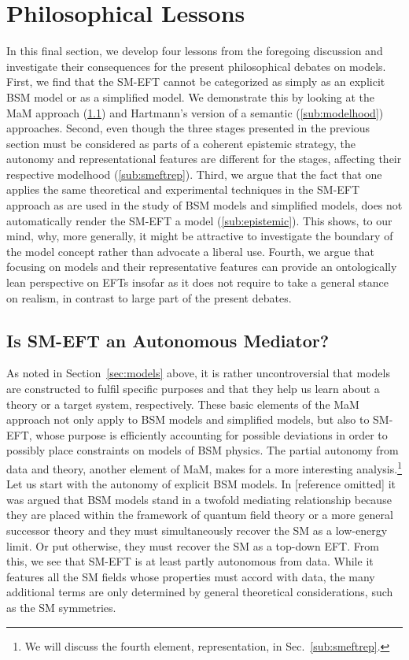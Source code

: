 \section{Philosophical Lessons}	%
\label{sec:analysis}


In this final section, we develop four lessons from the foregoing discussion and investigate their consequences for the present philosophical debates on models. 
First, we find that the SM-EFT cannot be categorized as simply as an explicit BSM model or as a simplified model. 
We demonstrate this by looking at the MaM approach (\ref{sub:autonomy}) and Hartmann's version of a semantic (\ref{sub:modelhood}) approaches. 
Second, even though the three stages presented in the previous section must be considered as parts of a coherent epistemic strategy, the autonomy and representational features are different for the stages, affecting their respective modelhood (\ref{sub:smeftrep}).
Third, we argue that the fact that one applies the same theoretical and experimental techniques in the SM-EFT approach as are used in the study of BSM models and simplified models, does not automatically render the SM-EFT a model (\ref{sub:epistemic}). 
This shows, to our mind, why, more generally, it might be attractive to investigate the boundary of the model concept rather than advocate a liberal use. 
Fourth, we argue that focusing on models and their representative features can provide an ontologically lean perspective on EFTs insofar as it does not require to take a general stance on realism, in contrast to large part of the present debates.


\subsection{Is SM-EFT an Autonomous Mediator?} %
\label{sub:autonomy}

As noted in Section~\ref{sec:models} above, it is rather uncontroversial that models are constructed to fulfil specific purposes and that they help us learn about a theory or a target system, respectively.
These basic elements of the MaM approach not only apply to BSM models and simplified models, but also to SM-EFT, whose purpose is efficiently accounting for possible deviations in order to possibly place constraints on models of BSM physics. 
The partial autonomy from data and theory, another element of MaM, makes for a more interesting analysis.\footnote{We will discuss the fourth element, representation, in Sec.~\ref{sub:smeftrep}.}
Let us start with the autonomy of explicit BSM models.
In [reference omitted] it was argued that BSM models stand in a twofold mediating relationship because they are placed within the framework of quantum field theory or a more general successor theory and they must simultaneously recover the SM as a low-energy limit. 
Or put otherwise, they must recover the SM as a top-down EFT.
From this, we see that SM-EFT is at least partly autonomous from data. While it features all the SM fields whose properties must accord with data, the many additional terms are only determined by general theoretical considerations, such as the SM symmetries.

